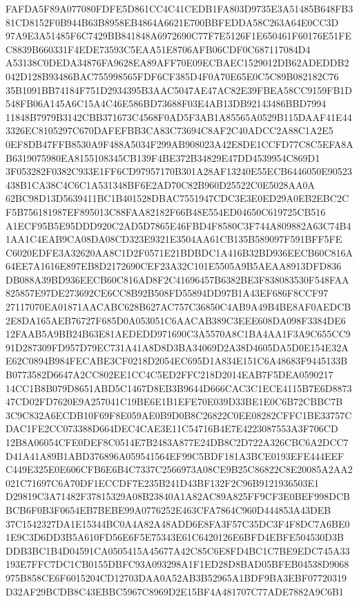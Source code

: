 \documentclass[UTF8,fontset=fandol,zihao=-4,a4paper]{ctexart}
\begin{document}
{{FAFDA5F89A077080FDFE5D861CC4C41CEDB1FA803D9735E3A51485B648FB381CD8152F0B944B63B8958EB4864A6621E700BBFEDDA58C263A64E0CC3D
97A9E3A51485F6C7429BB841848A6972690C77F7E5126F1E650461F60176E51FEC8839B660331F4EDE73593C5EAA51E8706AFB06CDF0C687117084D4
A53138C0DEDA34876FA9628EA89AFF70E09ECBAEC1529012DB62ADEDDB2042D128B93486BAC755998565FDF6CF385D4F0A70E65E0C5C89B082182C76
35B1091BB74184F751D2934395B3AAC5047AE47AC82E39FBEA58CC9159FB1D548FB06A145A6C15A4C46E586BD73688F03E4AB13DB92143486BBD7994
11848B7979B3142CBB371673C4568F0AD5F3AB1A85565A0529B115DAAF41E443326EC8105297C670DAFEFBB3CA83C73694C8AF2C40ADCC2A88C1A2E5
0EF8DB47FFB8530A9F488A5034F299AB908023A42E8DE1CCFD77C8C5EFA8AB6319075980EA8155108345CB139F4BE372B34829E47DD4539954C869D1
3F053282F0382C933E1FF6CD97957170B301A28AF13240E55ECB6446050E90523438B1CA38C4C6C1A531348BF6E2AD70C82B960D25522C0E5028AA0A
62BC98D13D5639411BC1B401528DBAC7551947CDC3E3E0ED29A0EB2EBC2CF5B756181987EF895013C88FAA82182F66B48E554ED04650C619725CB516
A1ECF95B5E95DDD920C2AD5D7865E46FBD4F8580C3F744A809882A63C74B41AA1C4EAB9CA08DA08CD323E9321E3504AA61CB135B589097F591BFF5FE
C6020EDFE3A32620AA8C1D2F0571E21BDBDC1A416B32BD936EECB60C816A64EE7A1616E897EB8D2172690CEF23A32C101E5505A9B5AEAA8913DFD836
DB088A39BD936EECB60C816AD8F2C41696457B6382BE3F838083530F548FAA825857E97DE273692CE6CC8B92B508FD55894DD97B1A43EF686F8CCF97
27117070EA01871AACABC628B627AC757C36850C4AB9A49B4BE8AF0AEDCB2E8DA165AEB76727F685D0A053051C6AACAB389C3EEE608DA098F3384DE6
12FAAB5A9BB24B63E81AEDEDD971690C3A5570A8C1BA4AA1F3A9C655CC991D287309FD957D79EC731A41A8D8D3BA34069D2A38D4605DA5D0E154E32A
E62C0894B984FECABE3CF0218D2054EC695D1A834E151C6A48683F9445133BB0773582D6647A2CC802EE1CC4C5ED2FFC218D2014EAB7F5DEA0590217
14CC1B8B079D8651ABD5C1467D8EB3B9644D666CAC3C1ECE4115B7E6D887347CD02FD7620E9A257041C19BE6E1B1EFE70E039D33BE1E0C6B72CBBC7B
3C9C832A6ECDB10F69F8E059AE0B9D0B8C26822C0EE08282CFFC1BE33757CDAC1FE2CC073388D664DEC4CAE3E11C54716B4E7E4223087553A3F706CD
12B8A06054CFE0DEF8C0514E7B2483A877E24DB8C2D722A326CBC6A2DCC7D41A41A89B1ABD376896A059541564EF99C5BDF181A3BCE0193EFE444EEF
C449E325E0E606CFB6E6B4C7337C2566973A08CE9B25C86822C8E20085A2AA2021C71697C6A70DF1ECCDF7E235B241D43BF132F2C96B9121936503E1
D29819C3A71482F37815329A08B23840A1A82AC89A825FF9CF3E0BEF998DCBBCB6F0B3F0654EB7BEBE99A0776252E463CFA7864C960D444853A43DEB
37C1542327DA1E15344BC0A4A82A48ADD6E8FA3F57C35DC3F4F8DC7A6BE01E9C3D6DD3B5A610FD56E6F5E75343E61C6420126E6BFD4EBFE504530D3B
DDB3BC1B4D04591CA0505415A45677A42C85C6E8FD4BC1C7BE9EDC745A33193E7FFC7DC1CB0155DBFC93A093298A1F1ED28D8BAD05BFEB04538D9068
975B858CE6F6015204CD12703DAA0A52AB3B52965A1BDF9BA3EBF07720319D32AF29BCDB8C43EBBC5967C8969D2E15BF4A481707C77ADE7882A9C6B1
}}
\end{document}
